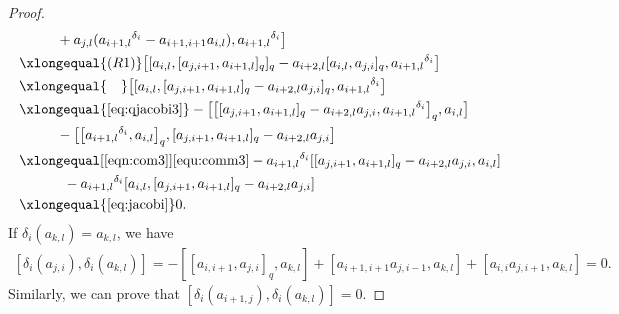 \documentclass[pdftex]{sigma}
\numberwithin{equation}{section}
\def\lr#1{\left[#1\right]}
\def\lrb#1{\left(#1\right)}
\def\d{\delta}
\begin{document}
\begin{proof}
\begin{align*}
&\qquad \ \ +a_{j,l} ({a_{i+1,l}}^{\d_i}-a_{i+1,i+1}a_{i,l} ), {a_{i+1,l}}^{\d_i} \bigr] \\
& \xlongequal{(R1)} \bigl[ [a_{i,l}, [a_{j,i+1}, a_{i+1,l} ]_q ]_q-a_{i+2,l} [a_{i,l}, a_{j,i} ]_q, {a_{i+1,l}}^{\d_i} \bigr] \\
 & \xlongequal{\quad} \bigl[ [a_{i,l}, [a_{j,i+1}, a_{i+1,l} ]_q -a_{i+2,l}a_{j,i} ]_q, {a_{i+1,l}}^{\d_i} \bigr] \\
& \xlongequal{\eqref{eq:qjacobi3}} - \bigl[ \bigl[ [a_{j,i+1}, a_{i+1,l} ]_q -a_{i+2,l}a_{j,i}, {a_{i+1,l}}^{\d_i} \bigr]_q, a_{i,l} \bigr] \\
& \qquad\ \ - \bigl[ \bigl[{a_{i+1,l}}^{\d_i} , a_{i,l} \bigr]_q, [a_{j,i+1}, a_{i+1,l} ]_q -a_{i+2,l}a_{j,i} \bigr] \\
 &\xlongequal[\eqref{eqn:com3}]{\eqref{equ:comm3}} -{a_{i+1,l}}^{\d_i} [ [a_{j,i+1}, a_{i+1,l} ]_q -a_{i+2,l}a_{j,i}, a_{i,l} ]\\
 &\qquad\quad\, -{a_{i+1,l}}^{\d_i} [a_{i,l}, [a_{j,i+1}, a_{i+1,l} ]_q -a_{i+2,l}a_{j,i} ] \\
& \xlongequal{\eqref{eq:jacobi}} 0.
 \end{align*}
 If $\d_i(a_{k,l})=a_{k,l}$, we have
\begin{eqnarray*}
\lr{\d_i\lrb{a_{j,i}}, \d_i\lrb{a_{k,l}}}
=-[\lr{a_{i,i+1}, a_{j,i}}_q, a_{k,l}]+\lr{a_{i+1,i+1}a_{j,i-1}, a_{k,l}}+\lr{a_{i,i}a_{j,i+1}, a_{k,l}}=0.
 \end{eqnarray*}
Similarly, we can prove that
$
\lr{\d_i\lrb{a_{i+1,j}}, \d_i\lrb{a_{k,l}}}=0$.


\end{proof}
\end{document}
